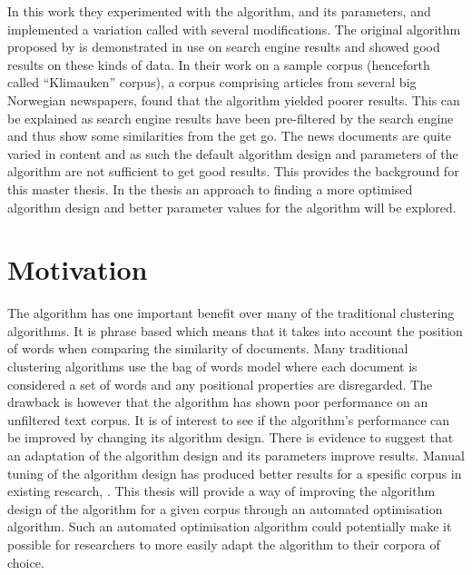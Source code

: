 In this work they experimented with the \STC algorithm, and its parameters, and implemented a variation called \CTC with several modifications. The original \STC algorithm proposed by \textcite{Oren1998} is demonstrated in use on search engine results and showed good results on these kinds of data. In their work on a sample corpus (henceforth called ``Klimauken'' corpus), a corpus comprising articles from several big Norwegian newspapers, \cite{Moe2014compact} found that the \STC algorithm yielded poorer results. This can be explained as search engine results have been pre-filtered by the search engine and thus show some similarities from the get go. The news documents are quite varied in content and as such the default algorithm design and parameters of the \STC algorithm are not sufficient to get good results. This provides the background for this master thesis. In the thesis an approach to finding a more optimised algorithm design and better parameter values for the \CTC algorithm will be explored.


\section{Motivation}

The \STC algorithm has one important benefit over many of the traditional clustering algorithms. It is phrase based which means that it takes into account the position of words when comparing the similarity of documents. Many traditional clustering algorithms use the bag of words model where each document is considered a set of words and any positional properties are disregarded. The drawback is however that the \STC algorithm has shown poor performance on an unfiltered text corpus. It is of interest to see if the algorithm's performance can be improved by changing its algorithm design. There is evidence to suggest that an adaptation of the algorithm design and its parameters improve results. Manual tuning of the algorithm design has produced better results for a spesific corpus in existing research, \parencite{Moe2014,Moe2014compact}. This thesis will provide a way of improving the algorithm design of the \CTC algorithm for a given corpus through an automated optimisation algorithm. Such an automated optimisation algorithm could potentially make it possible for researchers to more easily adapt the \CTC algorithm to their corpora of choice.

